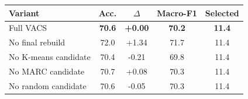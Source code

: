 \begin{tabular}{lcccc}
\toprule
Variant & Acc. & $\Delta$ & Macro-F1 & Selected \\
\midrule
Full VACS & \textbf{70.6} & \textbf{+0.00} & \textbf{70.2} & \textbf{11.4} \\
No final rebuild & 72.0 & +1.34 & 71.7 & 11.4 \\
No K-means candidate & 70.4 & -0.21 & 69.8 & 11.4 \\
No MARC candidate & 70.7 & +0.08 & 70.3 & 11.4 \\
No random candidate & 70.6 & -0.05 & 70.3 & 11.4 \\
\bottomrule
\end{tabular}
